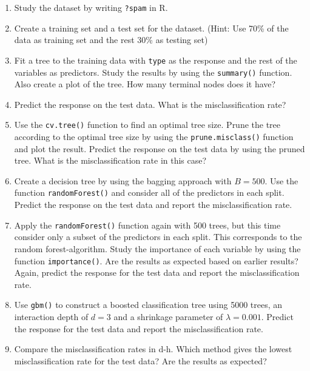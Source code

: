 \documentclass[]{article}
\begin{document}
\begin{enumerate}
\def\labelenumi{\alph{enumi})}
\item
  Study the dataset by writing \texttt{?spam} in R.
\item
  Create a training set and a test set for the dataset. (Hint: Use 70\%
  of the data as training set and the rest 30\% as testing set)
\item
  Fit a tree to the training data with \texttt{type} as the response and
  the rest of the variables as predictors. Study the results by using
  the \texttt{summary()} function. Also create a plot of the tree. How
  many terminal nodes does it have?
\item
  Predict the response on the test data. What is the misclassification
  rate?
\item
  Use the \texttt{cv.tree()} function to find an optimal tree size.
  Prune the tree according to the optimal tree size by using the
  \texttt{prune.misclass()} function and plot the result. Predict the
  response on the test data by using the pruned tree. What is the
  misclassification rate in this case?
\item
  Create a decision tree by using the bagging approach with \(B=500\).
  Use the function \texttt{randomForest()} and consider all of the
  predictors in each split. Predict the response on the test data and
  report the misclassification rate.
\item
  Apply the \texttt{randomForest()} function again with 500 trees, but
  this time consider only a subset of the predictors in each split. This
  corresponds to the random forest-algorithm. Study the importance of
  each variable by using the function \texttt{importance()}. Are the
  results as expected based on earlier results? Again, predict the
  response for the test data and report the misclassification rate.
\item
  Use \texttt{gbm()} to construct a boosted classification tree using
  5000 trees, an interaction depth of \(d=3\) and a shrinkage parameter
  of \(\lambda=0.001\). Predict the response for the test data and
  report the misclassification rate.
\item
  Compare the misclassification rates in d-h. Which method gives the
  lowest misclassification rate for the test data? Are the results as
  expected?
\end{enumerate}
\end{document}

